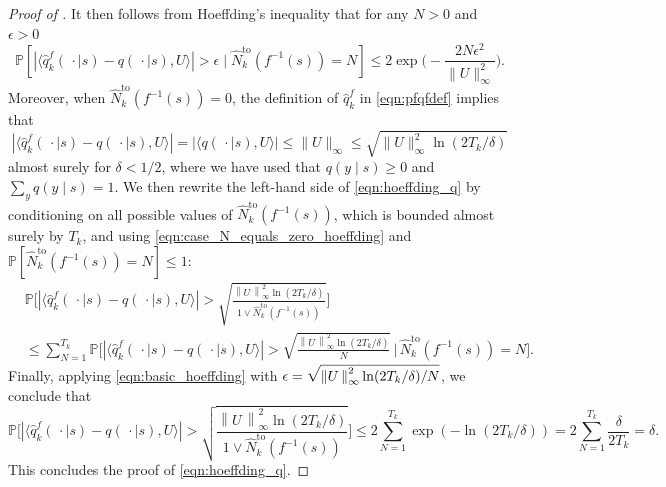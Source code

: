 \documentclass[10pt,a4paper]{amsart}
\newcommand{\bkt}[1]{\left[#1\right]}
\newcommand{\mbbP}{\mathbb{P}}
\newcommand{\norm}[1]{\left\lVert#1\,\right\rVert}
\begin{document}
\begin{proof}[Proof of ]
	It then follows from Hoeffding's inequality that for any $N>0$ and $\epsilon>0$
	\begin{equation}
		\label{eqn:basic_hoeffding}
		\mbbP\bkt{
		|\langle \hat{q}^f_k(\,\cdot \mid s)-q(\,\cdot \mid s), U\rangle| > \epsilon
		\mid
		\hat{N}^{\mathrm{to}}_k(f^{-1}(s))=N
		}
		\leq
		2\exp\biggl(
		-
		\frac{2N\epsilon^2}{\lVert U\rVert_{\infty}^2}
		\biggr)
		.
	\end{equation}
	Moreover, when $\hat{N}^{\mathrm{to}}_k(f^{-1}(s))=0$, the definition of $\hat{q}_k^f$ in \eqref{eqn:pfqfdef} implies that
	\begin{equation}
		\label{eqn:case_N_equals_zero_hoeffding}
		|\langle \hat{q}_k^f(\,\cdot \mid s) - q(\,\cdot \mid s), U\rangle |
		=
		|\langle q(\,\cdot \mid s), U\rangle|
		\leq
		\lVert U\rVert_{\infty}
		\leq
		\sqrt{\lVert U\rVert_{\infty}^2\ln(2T_k/\delta)}
	\end{equation}
	almost surely for $\delta<1/2$, where we have used that $q(y\mid s)\geq 0$ and $\sum_{y}q(y\mid s)=1$.
	We then rewrite the left-hand side of \eqref{eqn:hoeffding_q} by conditioning on all possible values of $\hat{N}^{\mathrm{to}}_k(f^{-1}(s))$, which is bounded almost surely by $T_k$, and using \eqref{eqn:case_N_equals_zero_hoeffding} and $\mbbP[\hat{N}^{\mathrm{to}}_k(f^{-1}(s))=N]\leq 1$:
	\begin{equation}
		\label{eqn:sum_over_all_values_of_N}
		\begin{split}
			 &
			\mbbP\biggl[
			|\langle \hat{q}^f_k(\,\cdot \mid s)-q(\,\cdot \mid s), U\rangle |>\sqrt{\frac{\norm{U}_{\infty}^2\ln(2T_k/\delta)}{1\vee\hat{N}^{\mathrm{to}}_k(f^{-1}(s))}}
			\biggr]
			\\
			 &
			\leq
			\sum_{N=1}^{T_k}
			\mbbP\biggl[
			|\langle \hat{q}^f_k(\,\cdot \mid s)-q(\,\cdot \mid s), U\rangle|>\sqrt{\frac{\norm{U}_{\infty}^2\ln(2T_k/\delta)}{N}}
			\,\bigg|\,
			\hat{N}^{\mathrm{to}}_k(f^{-1}(s)) = N
			\biggr]
			.
		\end{split}
	\end{equation}
	Finally, applying \eqref{eqn:basic_hoeffding} with $\epsilon = \sqrt{\smash[b]{\norm{U}_{\infty}^2\ln(2T_k/\delta)/N}}$, we conclude that
	\begin{equation}
		\mbbP\biggl[
		|\langle \hat{q}^f_k(\,\cdot \mid s)-q(\,\cdot \mid s), U\rangle |>\sqrt{\frac{\norm{U}_{\infty}^2\ln(2T_k/\delta)}{1\vee\hat{N}^{\mathrm{to}}_k(f^{-1}(s))}}
		\biggr]
		\leq
		2\sum_{N=1}^{T_k}
		\exp(
		-
		\ln(2T_k/\delta)
		)
		=
		2\sum_{N=1}^{T_k}\frac{\delta}{2T_k}
		=
		\delta.
	\end{equation}
	This concludes the proof of \eqref{eqn:hoeffding_q}.


\end{proof}
\end{document}
